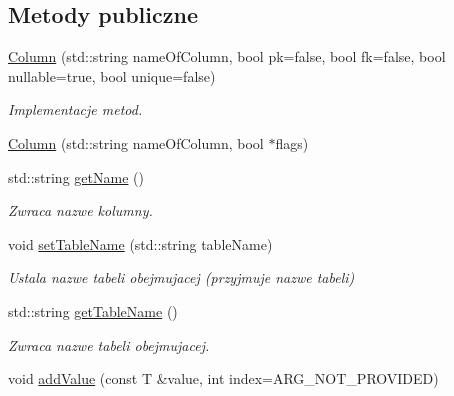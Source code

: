 \subsection*{Metody publiczne}
\begin{DoxyCompactItemize}
\item 
\mbox{\hyperlink{class_column_ac244a78d96a7a83cb2bf201a4b65cc60}{Column}} (std\+::string name\+Of\+Column, bool pk=false, bool fk=false, bool nullable=true, bool unique=false)
\begin{DoxyCompactList}\small\item\em Implementacje metod. \end{DoxyCompactList}\item 
\mbox{\hyperlink{class_column_a2563bd8f764ee4423fdb8426e5ff3d2d}{Column}} (std\+::string name\+Of\+Column, bool $\ast$flags)
\item 
\mbox{\label{class_column_ac4dff6048d07de37b640caa291765c28}} 
std\+::string \mbox{\hyperlink{class_column_ac4dff6048d07de37b640caa291765c28}{get\+Name}} ()
\begin{DoxyCompactList}\small\item\em Zwraca nazwe kolumny. \end{DoxyCompactList}\item 
\mbox{\label{class_column_afb265d4dd087deed41448b68cfc7bb76}} 
void \mbox{\hyperlink{class_column_afb265d4dd087deed41448b68cfc7bb76}{set\+Table\+Name}} (std\+::string table\+Name)
\begin{DoxyCompactList}\small\item\em Ustala nazwe tabeli obejmujacej (przyjmuje nazwe tabeli) \end{DoxyCompactList}\item 
\mbox{\label{class_column_ae43964d7b88d4c9e7e357b285edc5ed5}} 
std\+::string \mbox{\hyperlink{class_column_ae43964d7b88d4c9e7e357b285edc5ed5}{get\+Table\+Name}} ()
\begin{DoxyCompactList}\small\item\em Zwraca nazwe tabeli obejmujacej. \end{DoxyCompactList}\item 
\mbox{\label{class_column_a3e83b7a782fb92f5308122e522c8b8c4}} 
void \mbox{\hyperlink{class_column_a3e83b7a782fb92f5308122e522c8b8c4}{add\+Value}} (const T \&value, int index=A\+R\+G\+\_\+\+N\+O\+T\+\_\+\+P\+R\+O\+V\+I\+D\+ED)

\end{DoxyCompactItemize}
